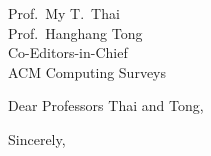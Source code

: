 \documentclass[11pt,a4paper]{letter}
\begin{document}
\begin{letter}{Prof.\ My T.\ Thai \\ Prof.\ Hanghang Tong \\ Co-Editors-in-Chief \\ ACM Computing Surveys}

\opening{Dear Professors Thai and Tong,}


\closing{Sincerely,}

\end{letter}
\end{document}
